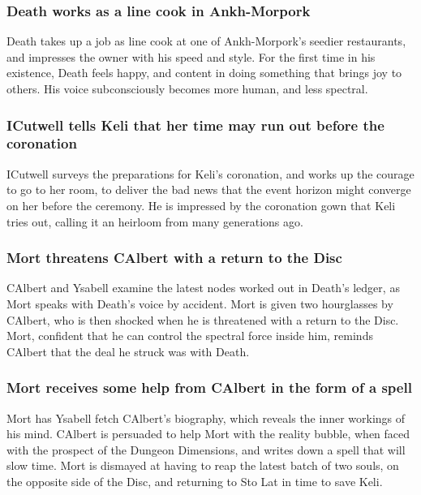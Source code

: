 \subsubsection{\Gls{Death} works as a line cook in Ankh-Morpork}
\Gls{Death} takes up a job as line cook at one of Ankh-Morpork's seedier restaurants, and impresses
the owner with his speed and style. For the first time in his existence, \Gls{Death} feels happy,
and content in doing something that brings joy to others. His voice subconsciously becomes more
human, and less spectral.

\subsubsection{\Gls{ICutwell} tells \Gls{Keli} that her time may run out before the coronation}
\Gls{ICutwell} surveys the preparations for \Gls{Keli}'s coronation, and works up the courage to
go to her room, to deliver the bad news that the event horizon might converge on her before the
ceremony. He is impressed by the coronation gown that \Gls{Keli} tries out, calling it an heirloom
from many generations ago.

\subsubsection{\Gls{Mort} threatens \Gls{CAlbert} with a return to the Disc}
\Gls{CAlbert} and \Gls{Ysabell} examine the latest nodes worked out in \Gls{Death}'s ledger, as
\Gls{Mort} speaks with \Gls{Death}'s voice by accident. \Gls{Mort} is given two hourglasses by
\Gls{CAlbert}, who is then shocked when he is threatened with a return to the Disc. \Gls{Mort},
confident that he can control the spectral force inside him, reminds \Gls{CAlbert} that the deal he
struck was with \Gls{Death}.

\subsubsection{\Gls{Mort} receives some help from \Gls{CAlbert} in the form of a spell}
\Gls{Mort} has \Gls{Ysabell} fetch \Gls{CAlbert}'s biography, which reveals the inner workings of
his mind. \Gls{CAlbert} is persuaded to help \Gls{Mort} with the reality bubble, when faced with the
prospect of the Dungeon Dimensions, and writes down a spell that will slow time. \Gls{Mort} is
dismayed at having to reap the latest batch of two souls, on the opposite side of the Disc, and
returning to Sto Lat in time to save \Gls{Keli}.

